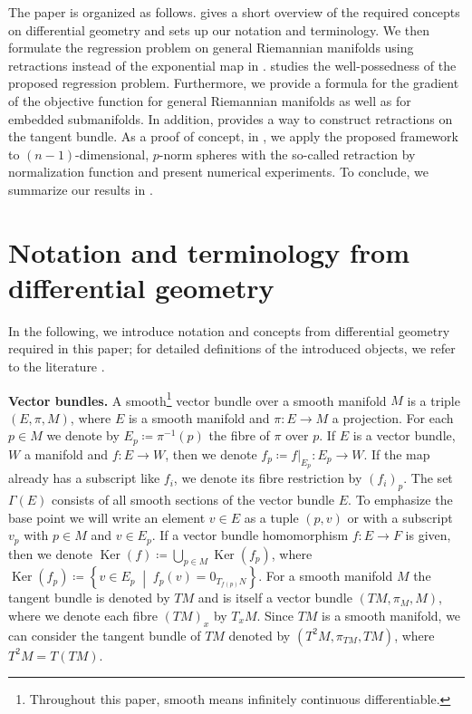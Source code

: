 \documentclass[11pt,a4paper]{article}
\theoremstyle{plain}
\theoremstyle{definition}
\newcommand{\set}[2]{\left\{#1 \;\middle|\; #2\right\}}		%
\DeclareMathOperator{\Ker}{Ker}
\begin{document}
The paper is organized as follows.  gives a short overview of the required concepts on differential geometry and sets up our notation and terminology. We then formulate the regression problem on general Riemannian manifolds using retractions instead of the exponential map in .  studies the well-possedness of the proposed regression problem. Furthermore, we provide a formula for the gradient of the objective function for general Riemannian manifolds as well as for embedded submanifolds. In addition,  provides a way to construct retractions on the tangent bundle.
As a proof of concept, in , we apply the proposed framework to $(n-1)$-dimensional, $p$-norm spheres with the so-called retraction by normalization function and present numerical experiments. To conclude, we summarize our results in .

\section{Notation and terminology from differential geometry}
\label{sec:Basics}

In the following, we introduce notation and concepts from differential geometry required in this paper; for detailed definitions of the introduced objects, we refer to the literature \cite{lang1999, leeJeffrey2009, lee2012, lee2018, michor2008}.

\textbf{Vector bundles.}
A smooth\footnote{Throughout this paper, smooth means infinitely continuous differentiable.} vector bundle over a smooth manifold $M$ is a triple $(E, \pi, M)$, where $E$ is a smooth manifold  and $\pi\colon E\to M$ a projection. For each $p\in M$ we denote by $E_p\coloneqq \pi^{-1}(p)$ the fibre of $\pi$ over $p$. If  $E$ is a vector bundle,  $W$ a manifold and  $f\colon E\to W$, then we denote $f_p\coloneqq f\big|_{E_p}\colon E_p\to W$. If the map already has a subscript like $f_i$, we denote its fibre restriction by $(f_i)_p$. The set $\Gamma(E)$ consists of all smooth sections of the vector bundle $E$.  To emphasize the base point we will write an element $v\in E$ as a tuple $(p, v)$ or with a subscript $v_p$ with $p\in M$ and $v\in E_p$. If a vector bundle homomorphism $f\colon E\to F$ is given, then we denote $\Ker(f)\coloneqq \bigcup_{p\in M} \Ker(f_p)$, where $\Ker(f_p)\coloneqq \set{v\in E_p}{f_p(v) = 0_{T_{f(p)}N}}$. For a smooth manifold $M$ the tangent bundle is denoted by $TM$ and is itself a vector bundle $(TM, \pi_M, M)$, where we denote each fibre $(TM)_x$ by $T_xM$. Since $TM$ is a smooth manifold, we can consider the tangent bundle of $TM$ denoted by $(T^2M, \pi_{TM}, TM)$, where $T^2M = T(TM)$.
\end{document}
